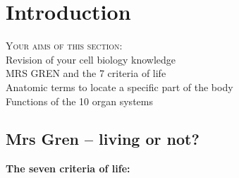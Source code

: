 \section{Introduction}\label{sec:EinleitAnatomie}
	\begin{sloppypar}
	 \begin{description}
	\item \textsc{Your aims of this section:}\\
	Revision of your cell biology knowledge \\
	MRS GREN and the 7 criteria of life \\
	Anatomic terms to locate a specific part of the body \\
	Functions of the 10 organ systems \\
	\end{description}
	\end{sloppypar}
\subsection{Mrs Gren -- living or not?}


\textbf{The seven criteria of life:}

